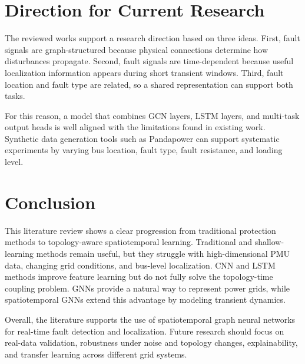 \documentclass[12pt,a4paper]{article}
\begin{document}
\section{Direction for Current Research}

The reviewed works support a research direction based on three ideas. First, fault signals are graph-structured because physical connections determine how disturbances propagate. Second, fault signals are time-dependent because useful localization information appears during short transient windows. Third, fault location and fault type are related, so a shared representation can support both tasks.

For this reason, a model that combines GCN layers, LSTM layers, and multi-task output heads is well aligned with the limitations found in existing work. Synthetic data generation tools such as Pandapower \cite{thurner2018} can support systematic experiments by varying bus location, fault type, fault resistance, and loading level.

\section{Conclusion}

This literature review shows a clear progression from traditional protection methods to topology-aware spatiotemporal learning. Traditional and shallow-learning methods remain useful, but they struggle with high-dimensional PMU data, changing grid conditions, and bus-level localization. CNN and LSTM methods improve feature learning but do not fully solve the topology-time coupling problem. GNNs provide a natural way to represent power grids, while spatiotemporal GNNs extend this advantage by modeling transient dynamics.

Overall, the literature supports the use of spatiotemporal graph neural networks for real-time fault detection and localization. Future research should focus on real-data validation, robustness under noise and topology changes, explainability, and transfer learning across different grid systems.
\end{document}

